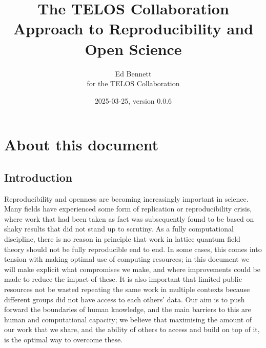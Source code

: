 \documentclass{article}
\title{The TELOS Collaboration Approach to Reproducibility and Open Science}
\author{Ed Bennett\\for the TELOS Collaboration}
\date{2025-03-25, version 0.0.6}
\begin{document}
\maketitle


\makeatletter
\renewcommand\tableofcontents{%
    \subsection{\contentsname
        \@mkboth{%
           \MakeUppercase\contentsname}{\MakeUppercase\contentsname}}%
    \@starttoc{toc}%
  }
\makeatother

\section{About this document}

\subsection{Introduction}

Reproducibility and openness are becoming increasingly important in science.
Many fields have experienced some form of replication or reproducibility crisis,
where work that had been taken as fact was subsequently found
to be based on shaky results that did not stand up to scrutiny.
As a fully computational discipline,
there is no reason in principle
that work in lattice quantum field theory should not be fully reproducible end to end.
In some cases,
this comes into tension with making optimal use of computing resources;
in this document we will make explicit what compromises we make,
and where improvements could be made to reduce the impact of these.
It is also important that limited public resources not be wasted
repeating the same work in multiple contexts
because different groups did not have access to each others' data.
Our aim is to push forward the boundaries of human knowledge,
and the main barriers to this are human and computational capacity;
we believe that maximising the amount of our work that we share,
and the ability of others to access and build on top of it,
is the optimal way to overcome these.
\end{document}
